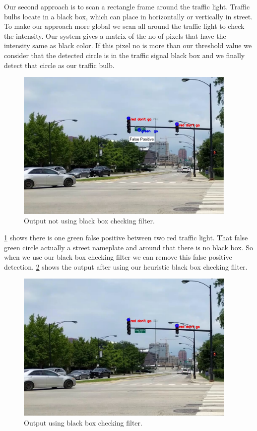 Our second approach is to scan a rectangle frame  around the traffic light.
Traffic bulbs locate in a black box, which can place in horizontally or vertically in street.
To make our approach more global we scan all around the traffic light to check the intensity.
Our system gives a matrix of the no of pixels that have the intensity same as black color.
If this pixel no is more than our threshold value we consider that the detected circle is in the traffic signal black box and we finally detect that circle as our traffic bulb.
\begin{figure}[!ht]
\centering
\includegraphics[width=4.2in]{images/norec_filter.pdf}
\caption{Output not using black box checking filter.}
\label{f:norec_filter}
\end{figure}

\ref{f:norec_filter} shows there is one green false positive between two red traffic light.
That false green circle actually a street nameplate and around that there is no black box.
So when we use our black box checking filter we can remove this false positive detection.
\ref{f:rec_filter} shows the output after using our heuristic black box checking filter.




\begin{figure}[ht!]
\centering
\includegraphics[width=4.2in]{images/rec_filter.pdf}
\caption{Output using black box checking filter.}
\label{f:rec_filter}
\end{figure}

